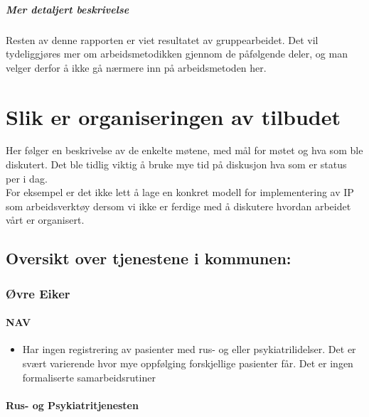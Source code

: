\documentclass[11pt]{report} %
\begin{document}
                    \paragraph{Mer detaljert beskrivelse\\}
                      Resten av denne rapporten er viet resultatet av gruppearbeidet. Det vil tydeliggjøres mer om arbeidsmetodikken gjennom de påfølgende deler, og man velger derfor å ikke gå nærmere inn på arbeidsmetoden her.  

                \chapter{Slik er organiseringen av tilbudet}\label{chap:org}
                  Her følger en beskrivelse av de enkelte møtene, med mål for møtet og hva som ble diskutert. Det ble tidlig viktig å bruke mye tid på diskusjon hva som er status per i dag.\\
                  For eksempel er det ikke lett å lage en konkret modell for implementering av IP som arbeidsverktøy dersom vi ikke er ferdige med å diskutere hvordan arbeidet vårt er organisert.\\

                  \section{Oversikt over tjenestene i kommunen:}
                   
                  \subsection{Øvre Eiker}\label{sec:org_oek}
                      
                      \subsubsection{NAV}
                        \begin{itemize} 
                          \item Har ingen registrering av pasienter med rus- og eller psykiatrilidelser. Det er svært varierende hvor mye oppfølging forskjellige pasienter får. Det er ingen formaliserte samarbeidsrutiner
                        \end{itemize}
                      
                      \subsubsection{Rus- og Psykiatritjenesten}
                      	
\end{document}
